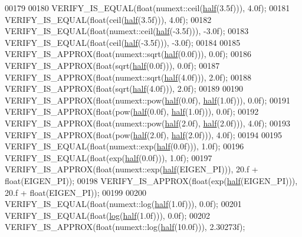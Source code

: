 \begin{DoxyCode}
00179 
00180   VERIFY\_IS\_EQUAL(\textcolor{keywordtype}{float}(numext::ceil(\hyperlink{struct_eigen_1_1half}{half}(3.5f))), 4.0f);
00181   VERIFY\_IS\_EQUAL(\textcolor{keywordtype}{float}(ceil(\hyperlink{struct_eigen_1_1half}{half}(3.5f))), 4.0f);
00182   VERIFY\_IS\_EQUAL(\textcolor{keywordtype}{float}(numext::ceil(\hyperlink{struct_eigen_1_1half}{half}(-3.5f))), -3.0f);
00183   VERIFY\_IS\_EQUAL(\textcolor{keywordtype}{float}(ceil(\hyperlink{struct_eigen_1_1half}{half}(-3.5f))), -3.0f);
00184 
00185   VERIFY\_IS\_APPROX(\textcolor{keywordtype}{float}(numext::sqrt(\hyperlink{struct_eigen_1_1half}{half}(0.0f))), 0.0f);
00186   VERIFY\_IS\_APPROX(\textcolor{keywordtype}{float}(sqrt(\hyperlink{struct_eigen_1_1half}{half}(0.0f))), 0.0f);
00187   VERIFY\_IS\_APPROX(\textcolor{keywordtype}{float}(numext::sqrt(\hyperlink{struct_eigen_1_1half}{half}(4.0f))), 2.0f);
00188   VERIFY\_IS\_APPROX(\textcolor{keywordtype}{float}(sqrt(\hyperlink{struct_eigen_1_1half}{half}(4.0f))), 2.0f);
00189 
00190   VERIFY\_IS\_APPROX(\textcolor{keywordtype}{float}(numext::pow(\hyperlink{struct_eigen_1_1half}{half}(0.0f), \hyperlink{struct_eigen_1_1half}{half}(1.0f))), 0.0f);
00191   VERIFY\_IS\_APPROX(\textcolor{keywordtype}{float}(pow(\hyperlink{struct_eigen_1_1half}{half}(0.0f), \hyperlink{struct_eigen_1_1half}{half}(1.0f))), 0.0f);
00192   VERIFY\_IS\_APPROX(\textcolor{keywordtype}{float}(numext::pow(\hyperlink{struct_eigen_1_1half}{half}(2.0f), \hyperlink{struct_eigen_1_1half}{half}(2.0f))), 4.0f);
00193   VERIFY\_IS\_APPROX(\textcolor{keywordtype}{float}(pow(\hyperlink{struct_eigen_1_1half}{half}(2.0f), \hyperlink{struct_eigen_1_1half}{half}(2.0f))), 4.0f);
00194 
00195   VERIFY\_IS\_EQUAL(\textcolor{keywordtype}{float}(numext::exp(\hyperlink{struct_eigen_1_1half}{half}(0.0f))), 1.0f);
00196   VERIFY\_IS\_EQUAL(\textcolor{keywordtype}{float}(exp(\hyperlink{struct_eigen_1_1half}{half}(0.0f))), 1.0f);
00197   VERIFY\_IS\_APPROX(\textcolor{keywordtype}{float}(numext::exp(\hyperlink{struct_eigen_1_1half}{half}(EIGEN\_PI))), 20.f + \textcolor{keywordtype}{float}(EIGEN\_PI));
00198   VERIFY\_IS\_APPROX(\textcolor{keywordtype}{float}(exp(\hyperlink{struct_eigen_1_1half}{half}(EIGEN\_PI))), 20.f + \textcolor{keywordtype}{float}(EIGEN\_PI));
00199 
00200   VERIFY\_IS\_EQUAL(\textcolor{keywordtype}{float}(numext::log(\hyperlink{struct_eigen_1_1half}{half}(1.0f))), 0.0f);
00201   VERIFY\_IS\_EQUAL(\textcolor{keywordtype}{float}(\hyperlink{structlog}{log}(\hyperlink{struct_eigen_1_1half}{half}(1.0f))), 0.0f);
00202   VERIFY\_IS\_APPROX(\textcolor{keywordtype}{float}(numext::log(\hyperlink{struct_eigen_1_1half}{half}(10.0f))), 2.30273f);

\end{DoxyCode}
